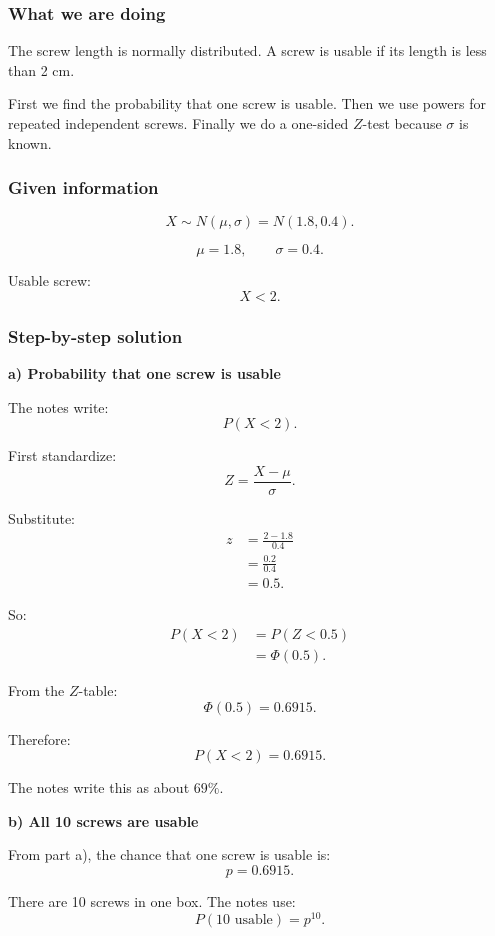 \documentclass[10pt]{article}
\begin{document}
\subsubsection*{What we are doing}

The screw length is normally distributed.
A screw is usable if its length is less than 2 cm.

First we find the probability that one screw is
usable. Then we use powers for repeated independent
screws. Finally we do a one-sided \(Z\)-test because
\(\sigma\) is known.

\subsubsection*{Given information}

\[
X\sim N(\mu,\sigma)
=N(1.8,0.4).
\]

\[
\mu=1.8,
\qquad
\sigma=0.4.
\]

Usable screw:
\[
X<2.
\]

\subsubsection*{Step-by-step solution}

\textbf{a) Probability that one screw is usable}

The notes write:
\[
P(X<2).
\]

First standardize:
\[
Z=\frac{X-\mu}{\sigma}.
\]

Substitute:
\begin{align*}
z
&=
\frac{2-1.8}{0.4}
\\[2mm]
&=
\frac{0.2}{0.4}
\\[2mm]
&=0.5.
\end{align*}

So:
\begin{align*}
P(X<2)
&=
P(Z<0.5)
\\[2mm]
&=
\Phi(0.5).
\end{align*}

From the \(Z\)-table:
\[
\Phi(0.5)=0.6915.
\]

Therefore:
\[
P(X<2)=0.6915.
\]

The notes write this as about \(69\%\).

\textbf{b) All 10 screws are usable}

From part a), the chance that one screw is usable is:
\[
p=0.6915.
\]

There are 10 screws in one box.
The notes use:
\[
P(\text{10 usable})
=p^{10}.
\]
\end{document}
